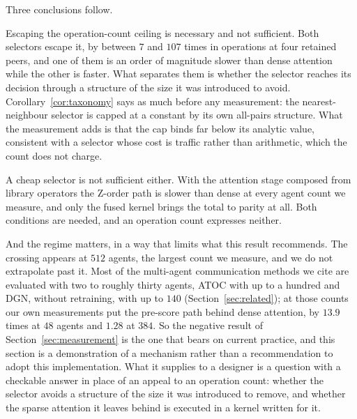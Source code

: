 Three conclusions follow.

Escaping the operation-count ceiling is necessary and not sufficient. Both
selectors escape it, by between $7$ and $107$ times in operations at
four retained peers, and one of
them is an order of magnitude slower than dense attention while the other is
faster. What separates them is whether the selector reaches its decision through
a structure of the size it was introduced to avoid.
Corollary~\ref{cor:taxonomy} says as much before any measurement: the
nearest-neighbour selector is capped at a constant by its own all-pairs
structure. What the measurement adds is that the cap binds far below its
analytic value, consistent with a selector whose cost is traffic rather than
arithmetic, which the count does not charge.

A cheap selector is not sufficient either. With the attention stage composed
from library operators the Z-order path is slower than dense at every agent
count we measure, and only the fused kernel brings the total to parity at all.
Both conditions are needed, and an operation count expresses neither.

And the regime matters, in a way that limits what this result recommends. The
crossing appears at $512$ agents, the largest count we measure, and we do not
extrapolate past it. Most of the multi-agent communication methods we cite are evaluated with two to roughly thirty agents, ATOC with up to a hundred and DGN, without retraining, with up to $140$ (Section~\ref{sec:related}); at those counts our own measurements put
the pre-score path behind dense attention, by $13.9$ times at $48$ agents and
$1.28$ at $384$. So the negative result of Section~\ref{sec:measurement} is the
one that bears on current practice, and this section is a demonstration of a
mechanism rather than a recommendation to adopt this implementation. What it
supplies to a designer is a question with a checkable answer in place of an
appeal to an operation count: whether the selector avoids a structure of the
size it was introduced to remove, and whether the sparse attention it leaves
behind is executed in a kernel written for it.
